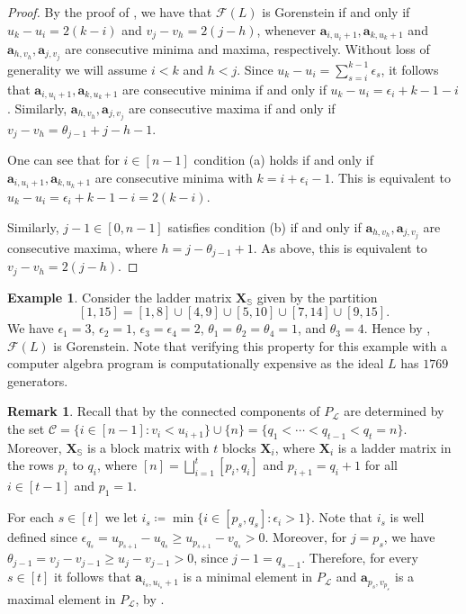 \documentclass[11pt,a4paper,reqno,dvipsnames]{amsart}
\theoremstyle{plain}
\theoremstyle{definition}
\newtheorem{Assumptions and Discussion}[Theorem]{Assumptions and Discussion}
\newtheorem{Example}[Theorem]{Example}
\newtheorem{Remark}[Theorem]{Remark}
\theoremstyle{remark}
\newcommand\bda{{\bm a}}
\newcommand\bfX{\mathbf{X}}
\newcommand\bfS{\mathbb{S}}
\newcommand\calC{\mathcal{C}}
\newcommand\calF{\mathcal{F}}
\newcommand\calL{\mathcal{L}}
\begin{document}
\begin{proof}
By the proof of , we have that $\calF(L)$ is Gorenstein if and only if $u_k-u_i=2(k-i)$ and $v_j-v_h=2(j-h)$, whenever $\bda_{i,u_i+1}, \bda_{k,u_k+1}$ and $\bda_{h,v_h}, \bda_{j,v_j}$ are consecutive minima and maxima, respectively. Without loss of generality we will assume $i<k$ and $h<j$.  Since $u_k - u_{i} = \sum_{s=i}^{k-1} \epsilon_s$, it follows that $\bda_{i,u_i+1}, \bda_{k,u_k+1}$ are consecutive minima if and only if $u_k-u_i=\epsilon_i+k-1-i$. Similarly, $\bda_{h,v_h}, \bda_{j,v_j}$ are consecutive maxima if and only if $v_j-v_h=\theta_{j-1}+j-h-1$. 

 One can see that for $i\in [n-1]$ condition (a) holds if and only if  $\bda_{i,u_i+1}, \bda_{k,u_k+1}$ are consecutive minima with $k=i+\epsilon_i-1$. This is equivalent to $u_k-u_i=\epsilon_i+k-1-i=2(k-i)$.%

Similarly,  $j-1\in [0,n-1]$ satisfies condition (b) if and only if $\bda_{h,v_h}, \bda_{j,v_j}$ are consecutive maxima, where $h=j-\theta_{j-1}+1$. As above, this is equivalent to  $v_j-v_h=2(j-h)$.
\end{proof}




 \begin{Example}\label{ex:Gorenstein}
     Consider the ladder matrix $\bfX_{\bfS}$ given by the partition \[[1,15]=[1,8]\cup[4,9]\cup [5,10]\cup [7,14]\cup [9,15].\] We have $\epsilon_1=3$, $\epsilon_2=1$, $\epsilon_3=\epsilon_4=2$, $\theta_1=\theta_2=\theta_4=1$, and $\theta_3=4$. Hence by , $\calF(L)$ is Gorenstein. Note that verifying this property for this example with a computer algebra program is computationally expensive as the ideal $L$ has $1769$ generators. 
 \end{Example}
 

\begin{Remark}\label{rem: block matrix}
    Recall that by  the connected components of $P_{\calL}$ are determined by the set $\calC=\{i\in [n-1]: v_i<u_{i+1}\} \cup \{n\}=\{q_1<\cdots <q_{t-1}<q_t=n\}$. Moreover, $\bfX_{\bfS}$ is a block matrix with $t$ blocks $\bfX_i$, where $\bfX_i$ is a ladder matrix in the rows $p_i$ to $q_i$, where $[n]=\bigsqcup_{i=1}^{t}[p_i,q_i]$ and $p_{i+1}=q_{i}+1$ for all $i\in[t-1]$ and $p_1=1$.
    
    
    For each $s\in [t]$ we let $i_s\coloneq\min\{i\in [p_s,q_s]: \epsilon_i>1\}$. Note that $i_s$ is well defined since $\epsilon_{q_s}=u_{p_{s+1}}-u_{q_s} \ge u_{p_{s+1}}-v_{q_s}>0$.  Moreover, for $j=p_s$, we have $\theta_{j-1}=v_{j}-v_{j-1}\ge u_{j}-v_{j-1}>0$, since $j-1=q_{s-1}$.  Therefore, for every $s\in [t]$ it follows that $\bda_{i_s, u_{i_s}+1}$ is a minimal element in $P_{\calL}$ and $\bda_{p_s, v_{p_s}}$ is a maximal element in $P_{\calL}$, by .
\end{Remark}
\end{document}
